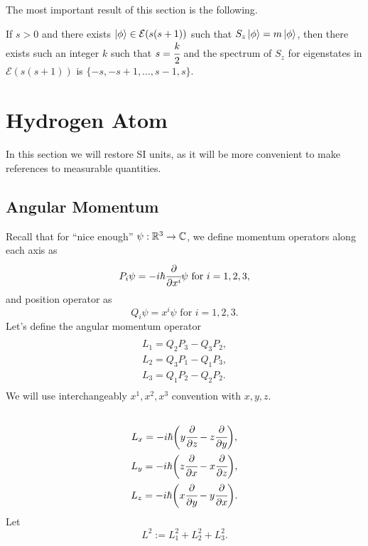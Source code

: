 \documentclass[main.tex]{subfiles}
\begin{document}
The most important result of this section is the following.

\begin{fact}
If $s > 0$ and there exists $\ket{\phi} \in \mathcal{E}(s(s + 1))$ such that $S_z\ket{\phi} = m\ket{\phi}$, then there exists such an integer $k$ such that $s = \cfrac{k}{2}$ and
the spectrum of $S_z$ for eigenstates in $\mathcal{E}(s(s + 1))$ is $\{-s, -s + 1, \dots, s - 1, s\}$.
\end{fact}


\section{Hydrogen Atom}
In this section we will restore SI units, as it will be more convenient to make references to measurable quantities.
\subsection{Angular Momentum}
Recall that for ``nice enough'' $\psi:\mathbb{R}^3\to\mathbb{C}$, we define momentum operators along each axis as
\begin{equation}
P_i \psi = -i\hbar \cfrac{\partial}{\partial x^i}\psi \text{ for } i=1,2,3,
\end{equation}
and position operator as
\begin{equation}
Q_i\psi = x^i\psi \text{ for } i=1,2,3.
\end{equation}
Let's define the angular momentum operator
\begin{multline}\\
L_1 = Q_2P_3 - Q_3P_2, \\
L_2 = Q_3P_1 - Q_1P_3, \\
L_3 = Q_1P_2 - Q_2P_2. \\
\end{multline}
We will use interchangeably $x^1, x^2, x^3$ convention with $x,y,z$.
\begin{multline}
\\
L_x = -i\hbar\bigg( y\cfrac{\partial}{\partial z} - z\cfrac{\partial}{\partial y}\bigg),\\
L_y = -i\hbar\bigg( z\cfrac{\partial}{\partial x} - x\cfrac{\partial}{\partial z}\bigg),\\
L_z = -i\hbar\bigg( x\cfrac{\partial}{\partial y} - y\cfrac{\partial}{\partial x}\bigg).\\
\end{multline}
Let 
\begin{equation}
L^2 := L_1^2 + L_2^2 + L_3^2.
\end{equation}
\end{document}
